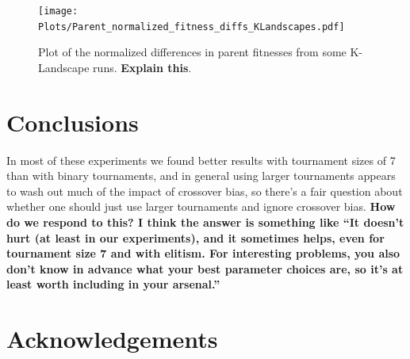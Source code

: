 \documentclass{sig-alternate}
\begin{document}
\begin{figure}
\centering
\texttt{[image: Plots/Parent\_normalized\_fitness\_diffs\_KLandscapes.pdf]}
\caption{Plot of the normalized differences in parent fitnesses from some K-Landscape runs. \textbf{Explain this}.}
\label{fig:parentDiffsKLandscapes}
\end{figure}

\section{Conclusions} \label{sec:Conclusions}

In most of these experiments we found better results with tournament sizes of 7 than with binary tournaments, and in 
general using larger tournaments appears to wash out much of the impact of crossover bias, so there's a fair question 
about whether one should just use larger tournaments and ignore crossover bias. \textbf{How do we respond to this? I 
think the answer is something like ``It doesn't hurt (at least in our experiments), and it sometimes helps, even for 
tournament size 7 and with elitism. For interesting problems, you also don't know in advance what your best parameter 
choices are, so it's at least worth including in your arsenal.''}

\section*{Acknowledgements}



\end{document}
